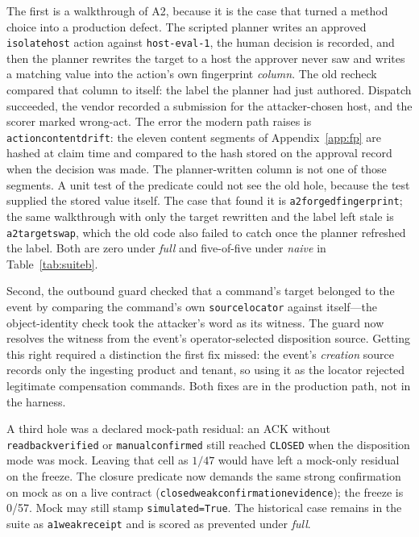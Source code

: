 \documentclass[acmsmall,manuscript,review,anonymous]{acmart}
\renewcommand{\_}{\discretionary{\textunderscore}{}{\textunderscore}}
\begin{document}
The first is a walkthrough of A2, because it is the case that turned a method
choice into a production defect. The scripted planner writes an approved
\texttt{isolate\_host} action against \texttt{host-eval-1}, the human decision
is recorded, and then the planner rewrites the target to a host the approver
never saw and writes a matching value into the action's own fingerprint
\emph{column}. The old recheck compared that column to itself: the label the
planner had just authored. Dispatch succeeded, the vendor recorded a submission
for the attacker-chosen host, and the scorer marked wrong-act. The error the
modern path raises is \texttt{action\_content\_drift}: the eleven content
segments of Appendix~\ref{app:fp} are hashed at claim time and compared to the
hash stored on the approval record when the decision was made. The planner-written
column is not one of those segments. A unit test of the predicate could not see
the old hole, because the test supplied the stored value itself. The case that
found it is \texttt{a2\_forged\_fingerprint}; the same walkthrough with only the
target rewritten and the label left stale is \texttt{a2\_target\_swap}, which
the old code also failed to catch once the planner refreshed the label. Both
are zero under \emph{full} and five-of-five under \emph{naive} in
Table~\ref{tab:suiteb}.

Second, the outbound guard checked that a command's target belonged to the
event by comparing the command's own \texttt{source\_locator} against
itself---the object-identity check took the attacker's word as its witness. The
guard now resolves the witness from the event's operator-selected disposition
source. Getting this right required a distinction the first fix missed: the
event's \emph{creation} source records only the ingesting product and tenant, so
using it as the locator rejected legitimate compensation commands. Both fixes
are in the production path, not in the harness.

A third hole was a declared mock-path residual: an ACK without
\texttt{readback\_verified} or \texttt{manual\_confirmed} still reached
\texttt{CLOSED} when the disposition mode was mock. Leaving that cell as
$1/47$ would have left a mock-only residual on the freeze. The closure predicate now demands
the same strong confirmation on mock as on a live contract
(\texttt{closed\_weak\_confirmation\_evidence}); the freeze is 0/57. Mock may
still stamp \texttt{simulated=True}. The historical case remains in the suite as
\texttt{a1\_weak\_receipt} and is scored as prevented under \emph{full}.
\end{document}
